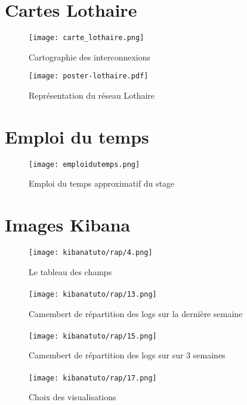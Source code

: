 \section{Cartes Lothaire}
\begin{figure}[H]
    \center
    \texttt{[image: carte\_lothaire.png]}
    \label{fig:imagereseaulothaire1}
    \caption{Cartographie des interconnexions}
\end{figure}
\begin{figure}[H]
    \center
    \texttt{[image: poster-lothaire.pdf]}
    \label{fig:imagereseaulothaire2}
    \caption{Représentation du réseau Lothaire}
\end{figure}

\section{Emploi du temps}
\begin{figure}[H]
    \center
    \texttt{[image: emploidutemps.png]}
    \label{fig:emploidutemps}
    \caption{Emploi du temps approximatif du stage}
\end{figure}

\section{Images Kibana}
\begin{figure}[H]
\center
\texttt{[image: kibanatuto/rap/4.png]}
\label{fig:kibanatuto4}
\caption{Le tableau des champs}
\end{figure}
\paragraph{}
\begin{figure}[H]
\center
\texttt{[image: kibanatuto/rap/13.png]}
\label{fig:kibanatuto8}
\caption{Camembert de répartition des logs sur la dernière semaine}
\end{figure}
\paragraph{}
\begin{figure}[H]
\center
\texttt{[image: kibanatuto/rap/15.png]}
\label{fig:kibanatuto9}
\caption{Camembert de répartition des logs sur sur 3 semaines}
\end{figure}
\paragraph{}
\begin{figure}[H]
\center
\texttt{[image: kibanatuto/rap/17.png]}
\label{fig:kibanatuto10}
\caption{Choix des visualisations}
\end{figure}
